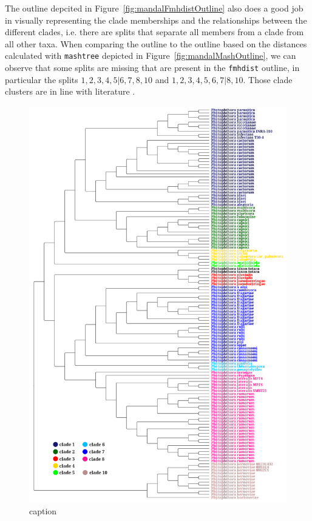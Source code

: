 The outline depcited in Figure~\ref{fig:mandalFmhdistOutline} also does a good
job in visually representing the clade memberships and the relationships between
the different clades, i.e. there are splits that separate all members from a
clade from all other taxa. When comparing the outline to the outline based on
the distances calculated with \texttt{mashtree} depicted in
Figure~\ref{fig:mandalMashOutline}, we can observe that some splits are missing
that are present in the \texttt{fmhdist} outline, in particular the splits $1, 2,
3, 4, 5 | 6, 7, 8, 10$ and $1, 2, 3, 4, 5, 6, 7 | 8, 10$. Those clade clusters
are in line with literature
\cite{yangExpandedPhylogenyGenus2017,abadPhytophthoraTaxonomicPhylogenetic2023a}.

\begin{figure}
  \centering
  \includegraphics[width=1.0\textwidth]{figures/fmhdist_mandal_tree_k21_s2000.png}
  \caption{caption}
  \label{fig:mandalFmhdistTree}
\end{figure}

